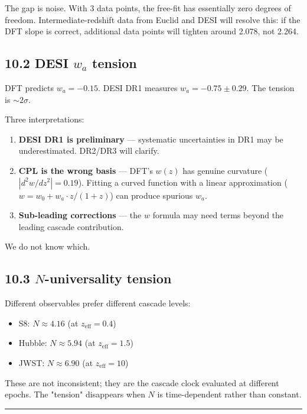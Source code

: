 \documentclass[11pt,a4paper]{article}
\providecommand{\tightlist}{\setlength{\itemsep}{0pt}\setlength{\parskip}{0pt}}
\begin{document}
The gap is noise. With 3 data points, the free-fit has essentially zero degrees of freedom. Intermediate-redshift data from Euclid and DESI will resolve this: if the DFT slope is correct, additional data points will tighten around 2.078, not 2.264.

\subsection*{10.2 DESI $w_a$ tension}

DFT predicts $w_a = -0.15$. DESI DR1 measures $w_a = -0.75 \pm 0.29$. The tension is $\sim 2\sigma$.

Three interpretations:
\begin{enumerate}\tightlist
\item \textbf{DESI DR1 is preliminary} — systematic uncertainties in DR1 may be underestimated. DR2/DR3 will clarify.
\item \textbf{CPL is the wrong basis} — DFT's $w(z)$ has genuine curvature ($|d^2w/dz^2| = 0.19$). Fitting a curved function with a linear approximation ($w = w_0 + w_a \cdot z/(1+z)$) can produce spurious $w_a$.
\item \textbf{Sub-leading corrections} — the $w$ formula may need terms beyond the leading cascade contribution.
\end{enumerate}

We do not know which.

\subsection*{10.3 $N$-universality tension}

Different observables prefer different cascade levels:
\begin{itemize}\tightlist
\item S8: $N \approx 4.16$ (at $z_{\text{eff}} = 0.4$)
\item Hubble: $N \approx 5.94$ (at $z_{\text{eff}} = 1.5$)
\item JWST: $N \approx 6.90$ (at $z_{\text{eff}} = 10$)
\end{itemize}

These are not inconsistent; they are the cascade clock evaluated at different epochs. The "tension" disappears when $N$ is time-dependent rather than constant.

\begin{center}\rule{0.5\linewidth}{0.4pt}\end{center}
\end{document}
